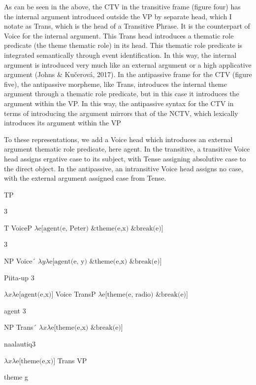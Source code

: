 \documentclass[output=paper,modfonts,nonflat]{langsci/langscibook}
\begin{document}
As can be seen in the above, the CTV in the transitive frame (figure four) has the internal argument introduced outside the VP by separate head, which I notate as Trans, which is the head of a Transitive Phrase.  It is the counterpart of Voice for the internal argument.  This Trans head introduces a thematic role predicate (the theme thematic role) in its head.  This thematic role predicate is integrated semantically through event identification.  In this way, the internal argument is introduced very much like an external argument or a high applicative argument (Johns \& Kučerová, 2017).  In the antipassive frame for the CTV (figure five), the antipassive morpheme, like Trans, introduces the internal theme argument through a thematic role predicate, but in this case it introduces the argument within the VP.  In this way, the antipassive syntax for the CTV in terms of introducing the argument mirrors that of the NCTV, which lexically introduces its argument within the VP

To these representations, we add a Voice head which introduces an external argument thematic role predicate, here agent.  In the transitive, a transitive Voice head assigns ergative case to its subject, with Tense assigning absolutive case to the direct object.  In the antipassive, an intransitive Voice head assigns no case, with the external argument assigned case from Tense.

    TP

       3

      T          VoiceP            $\lambda \text{e[}\text{agent(e, Peter) \&} \text{theme(}\text{e,x}\text{) \& break(e)]}$

                            3

    NP     Voice´   $\mathit{\lambda y\lambda} \text{e[}\text{agent(e, y) \&} \text{theme(}\text{e,x}\text{) \& break(e)]}$

        Piita-up  3

 $\mathit{\lambda x\lambda} \text{e[agent(e,x)]}$         Voice  TransP     $\lambda \text{e[theme(e, radio) \& break(e)]}$

             agent 3  

            NP        Trans´      $\mathit{\lambda x\lambda} \text{e[theme(e,x) \& break(e)]}$

      naalautiq3    

 $\mathit{\lambda x\lambda} \text{e[theme(e,x)]}$            Trans        VP

         theme           g
\end{document}
